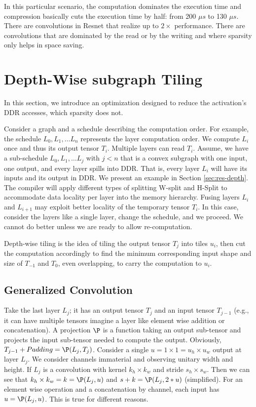 \documentclass[conference]{IEEEtran}
\begin{document}
In this particular scenario, the computation dominates the execution
time and compression basically cuts the execution time by half: from
200 $\mu s$ to 130 $\mu s$. There are convolutions in Resnet that
realize up to $2\times$ performance. There are convolutions that are
dominated by the read or by the writing and where sparsity only helps
in space saving.



\section{Depth-Wise subgraph Tiling}
In this section, we introduce an optimization designed to reduce the
activation's DDR accesses, which sparsity does not.

Consider a graph and a schedule describing the computation order. For
example, the schedule $L_0, L_1, \dots L_n$ represents the layer
computation order. We compute $L_i$ once and thus its output tensor
$T_i$.  Multiple layers can read $T_i$. Assume, we have a sub-schedule
$L_0, L_1, \dots L_j$ with $j<n$ that is a convex subgraph with one
input, one output, and every layer spills into DDR. That is, every
layer $L_i$ will have its inputs and its output in DDR. We present an
example in Section \ref{sec:res-depth}. The compiler will apply different types of splitting
W-split and H-Split to accommodate data locality per layer into the
memory hierarchy.  Fusing layers $L_i$ and $L_{i+1}$ may exploit
better locality of the temporary tensor $T_i$. In this case, consider
the layers like a single layer, change the schedule, and we
proceed. We cannot do better unless we are ready to allow
re-computation.

Depth-wise tiling is the idea of tiling the output tensor $T_j$ into
tiles $u_i$, then cut the computation accordingly to find the minimum
corresponding input shape and size of $T_{-1}$ and $T_0$, even
overlapping, to carry the computation to $u_i$. 

\subsection{Generalized Convolution} 
Take the last layer $L_j$; it has an output tensor $T_j$ and an input
tensor $T_{j-1}$ (e.g., it can have multiple tensors imagine a layer
like element wise addition or concatenation). A projection $\P$ is a
function taking an output sub-tensor and projects the input sub-tensor
needed to compute the output. Obviously, $T_{j-1} + Padding =
\P(L_j,T_j)$. Consider a single $u = 1\times 1 = u_h \times u_w$
output at layer $L_j$. We consider channels immaterial and observing
unitary width and height. If $L_j$ is a convolution with kernel
$k_h\times k_w$ and stride $s_h \times s_w$. Then we can see that
$k_h\times k_w = k = \P(L_j,u)$ and $s+k = \P(L_j,2*u)$ (simplified).
For an element wise operation and a concatenation by channel, each
input has $u = \P(L_j,u)$. This is true for different reasons.
\end{document}
